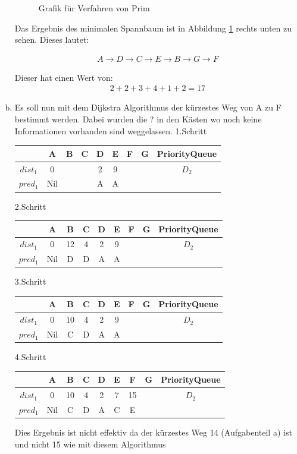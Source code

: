 \documentclass[11pt]{article}
\begin{document}
\begin{enumerate}[a)]
\begin{figure}[h!]
	\caption{Grafik für Verfahren von Prim}
	\label{fig:a2}
\end{figure}
Das Ergebnis des minimalen Spannbaum ist in Abbildung \ref{fig:a2} rechts unten
zu sehen. Dieses lautet:

\begin{align*}
A \rightarrow D \rightarrow C \rightarrow E \rightarrow B \rightarrow G \rightarrow F
\end{align*}


Dieser hat einen Wert von:
\begin{align*}
2 + 2 + 3 + 4 + 1 + 2 = 17
\end{align*} 
\item
Es soll nun mit dem Dijkstra Algorithmus der kürzestes Weg von A zu F bestimmt
werden. Dabei wurden die ? in den Kästen wo noch keine Informationen vorhanden
sind weggelassen.
1.Schritt

\begin{tabular}{|c|c|c|c|c|c|c|c|c|}
	\hline  		  & A & B & C & D & E & F & G & PriorityQueue\\ 
	\hline $dist_{1}$ & 0 &   &  & 2 & 9 &	&  & $D_{2}$\\ 
	\hline $pred_{1}$ & Nil &  &  & A & A &	&  &\\
	\hline 
\end{tabular} 

2.Schritt

\begin{tabular}{|c|c|c|c|c|c|c|c|c|}
	\hline  		  & A & B & C & D & E & F & G & PriorityQueue\\ 
	\hline $dist_{1}$ & 0 & 12  & 4 & 2 & 9 &  &  & $D_{2}$\\ 
	\hline $pred_{1}$ & Nil & D & D & A & A &  &  &\\
	\hline 
\end{tabular} 

3.Schritt

\begin{tabular}{|c|c|c|c|c|c|c|c|c|}
	\hline  		  & A & B & C & D & E & F & G & PriorityQueue\\ 
	\hline $dist_{1}$ & 0 & 10  & 4 & 2 & 9 &  &  & $D_{2}$\\ 
	\hline $pred_{1}$ & Nil & C & D & A & A &  &  &\\
	\hline 
\end{tabular}  

4.Schritt

\begin{tabular}{|c|c|c|c|c|c|c|c|c|}
	\hline  		  & A & B & C & D & E & F & G & PriorityQueue\\ 
	\hline $dist_{1}$ & 0 & 10  & 4 & 2 & 7 & 15 &  & $D_{2}$\\ 
	\hline $pred_{1}$ & Nil & C & D & A & C & E &  &\\
	\hline 
\end{tabular}

Dies Ergebnis ist nicht effektiv da der kürzestes Weg 14 (Aufgabenteil a) ist und nicht 15 wie mit diesem Algorithmus


\end{enumerate}
\end{document}
